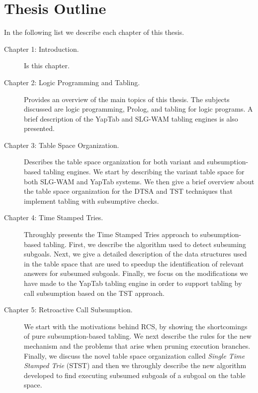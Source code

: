\section{Thesis Outline}

In the following list we describe each chapter of this thesis.

\begin{description}

   \item[Chapter 1: Introduction.] Is this chapter.
   
   \item[Chapter 2: Logic Programming and Tabling.] Provides an overview of the main topics of this thesis.
   The subjects discussed are logic programming, Prolog, and tabling for logic programs. A brief description
   of the YapTab and SLG-WAM tabling engines is also presented.
   
   \item[Chapter 3: Table Space Organization.] Describes the table space organization for both variant and
   subsumption-based tabling engines. We start by describing the variant table space for both SLG-WAM and
   YapTab systems. We then give a brief overview about the table space organization for the DTSA and TST
   techniques that implement tabling with subsumptive checks.
   
   \item[Chapter 4: Time Stamped Tries.] Throughly presents the Time Stamped Tries approach to subsumption-based
   tabling. First, we describe the algorithm used to detect subsuming subgoals. Next,
   we give a detailed description of the data structures used in the table space that are used to speedup
   the identification of relevant answers for subsumed subgoals. Finally, we focus on the modifications we have
   made to the YapTab tabling engine in order to support tabling by call subsumption based on the TST approach.
   
   \item[Chapter 5: Retroactive Call Subsumption.] We start with the motivations behind RCS, by showing the shortcomings
   of pure subsumption-based tabling. We next describe the rules for the new mechanism and the problems that arise
   when pruning execution branches. Finally, we discuss the novel table space organization called \emph{Single Time
   Stamped Trie} (STST) and then we throughly describe the new algorithm developed to find executing subsumed subgoals
   of a subgoal on the table space.
   

\end{description}
